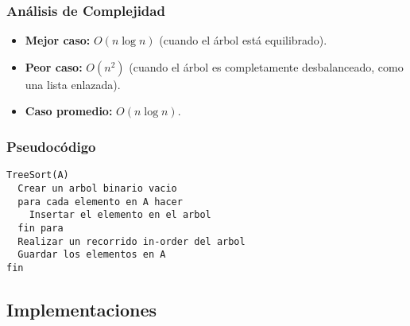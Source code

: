 \documentclass[11pt,openany]{book}
\begin{document}
\subsubsection{Análisis de Complejidad}
\begin{itemize}
    \item \textbf{Mejor caso:} $O(n \log n)$ (cuando el árbol está equilibrado).
    \item \textbf{Peor caso:} $O(n^2)$ (cuando el árbol es completamente desbalanceado, como una lista enlazada).
    \item \textbf{Caso promedio:} $O(n \log n)$.
\end{itemize}

\subsubsection{Pseudocódigo}
\begin{verbatim}
TreeSort(A)
  Crear un arbol binario vacio
  para cada elemento en A hacer
    Insertar el elemento en el arbol
  fin para
  Realizar un recorrido in-order del arbol
  Guardar los elementos en A
fin
\end{verbatim}

\subsection{Implementaciones}
\end{document}

